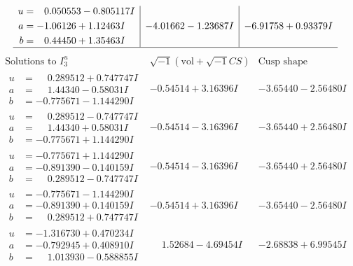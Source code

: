 \documentclass[1p]{elsarticle_modified}
\theoremstyle{definition}
\newcommand{\I}{\sqrt{-1}}
\begin{document}
$$\begin{array}{c|c|c}
\begin{aligned}
u &= \phantom{-}0.050553 - 0.805117 I \\
a &= -1.06126 + 1.12463 I \\
b &= \phantom{-}0.44450 + 1.35463 I\end{aligned}
 & -4.01662 - 1.23687 I & -6.91758 + 0.93379 I\\
 \hline 
 \end{array}$$\newpage$$\begin{array}{c|c|c}  
\text{Solutions to }I^u_{3}& \I (\text{vol} + \sqrt{-1}CS) & \text{Cusp shape}\\
 \hline 
\begin{aligned}
u &= \phantom{-}0.289512 + 0.747747 I \\
a &= \phantom{-}1.44340 - 0.58031 I \\
b &= -0.775671 - 1.144290 I\end{aligned}
 & -0.54514 + 3.16396 I & -3.65440 - 2.56480 I \\ \hline\begin{aligned}
u &= \phantom{-}0.289512 - 0.747747 I \\
a &= \phantom{-}1.44340 + 0.58031 I \\
b &= -0.775671 + 1.144290 I\end{aligned}
 & -0.54514 - 3.16396 I & -3.65440 + 2.56480 I \\ \hline\begin{aligned}
u &= -0.775671 + 1.144290 I \\
a &= -0.891390 - 0.140159 I \\
b &= \phantom{-}0.289512 - 0.747747 I\end{aligned}
 & -0.54514 - 3.16396 I & -3.65440 + 2.56480 I \\ \hline\begin{aligned}
u &= -0.775671 - 1.144290 I \\
a &= -0.891390 + 0.140159 I \\
b &= \phantom{-}0.289512 + 0.747747 I\end{aligned}
 & -0.54514 + 3.16396 I & -3.65440 - 2.56480 I \\ \hline\begin{aligned}
u &= -1.316730 + 0.470234 I \\
a &= -0.792945 + 0.408910 I \\
b &= \phantom{-}1.013930 - 0.588855 I\end{aligned}
 & \phantom{-}1.52684 - 4.69454 I & -2.68838 + 6.99545 I \\ \hline\begin{aligned}

\end{aligned}
\end{array}$$
\end{document}
